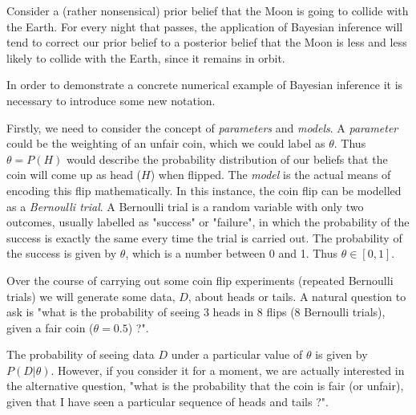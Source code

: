 Consider a (rather nonsensical) prior belief that the Moon is going to collide with the Earth. For every night that passes, the application of Bayesian inference will tend to correct our prior belief to a posterior belief that the Moon is less and less likely to collide with the Earth, since it remains in orbit.

In order to demonstrate a concrete numerical example of Bayesian inference it is necessary to introduce some new notation.

Firstly, we need to consider the concept of \emph{parameters} and \emph{models}. A \emph{parameter} could be the weighting of an unfair coin, which we could label as $\theta$. Thus $\theta = P(H)$ would describe the probability distribution of our beliefs that the coin will come up as head ($H$) when flipped. The \emph{model} is the actual means of encoding this flip mathematically. In this instance, the coin flip can be modelled as a \emph{Bernoulli trial}. A Bernoulli trial is a random variable with only two outcomes, usually labelled as "success" or "failure", in which the probability of the success is exactly the same every time the trial is carried out. The probability of the success is given by $\theta$, which is a number between 0 and 1. Thus $\theta\in[0,1]$.

Over the course of carrying out some coin flip experiments (repeated Bernoulli trials) we will generate some data, $D$, about heads or tails. A natural question to ask is "what is the probability of seeing 3 heads in 8 flips (8 Bernoulli trials), given a fair coin ($\theta=0.5$) ?".

The probability of seeing data $D$ under a particular value of $\theta$ is given by $P(D|\theta)$. However, if you consider it for a moment, we are actually interested in the alternative question, "what is the probability that the coin is fair (or unfair), given that I have seen a particular sequence of heads and tails ?".

